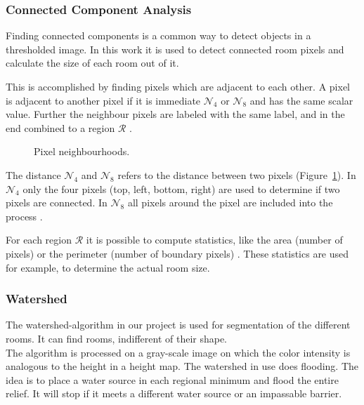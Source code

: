 \subsubsection{Connected Component Analysis}
\label{sub:ConnectedComponentAnalysis}
Finding connected components is a common way to detect objects in a thresholded image. In this work it is used to detect connected room pixels and calculate the size of each room out of it.

This is accomplished by finding pixels which are adjacent to each other. A pixel is adjacent to another pixel if it is immediate $\mathcal{N}_4$ or $\mathcal{N}_8$ and has the same scalar value. Further the neighbour pixels are labeled with the same label, and in the end combined to a region $\mathcal{R}$ \citep[Section 3.3.4]{szeliski_2011}.

\begin{figure}[h]
	\centering
	\hfill
	\caption{Pixel neighbourhoods.}
	\label{fig:pixel_neighbourhood}
\end{figure}

The distance $\mathcal{N}_4$ and $\mathcal{N}_8$ refers to the distance between two pixels (Figure~\ref{fig:pixel_neighbourhood}). In $\mathcal{N}_4$ only the four pixels (top, left, bottom, right) are used to determine if two pixels are connected. In $\mathcal{N}_8$ all pixels around the pixel are included into the process \citep{burger_burge_2016}.

For each region $\mathcal{R}$ it is possible to compute statistics, like the area (number of pixels) or the perimeter (number of boundary pixels) \citep[Section 3.3.4]{szeliski_2011}. These statistics are used for example, to determine the actual room size.

\subsubsection{Watershed}
\label{subsub:watershed}
The watershed-algorithm in our project is used for segmentation of the different rooms. It can find rooms, indifferent of their shape.
\\
The algorithm is processed on a gray-scale image on which the color intensity is analogous to the height in a height map. The watershed in use does flooding. The idea is to place a water source in each regional minimum and flood the entire relief. It will stop if it meets a different water source or an impassable barrier.

